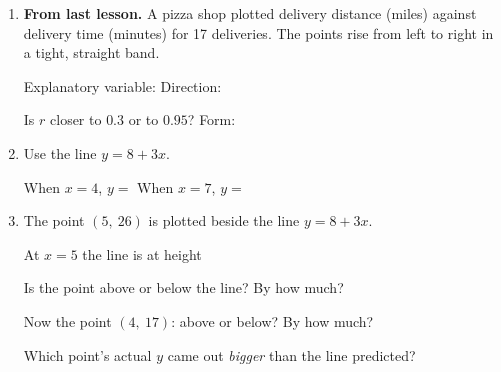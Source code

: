 \documentclass[12pt]{article}
\begin{document}

\vspace{0.28in}

\begin{enumerate}[leftmargin=1.9em, itemsep=1.0in]

  \item \textbf{From last lesson.} A pizza shop plotted delivery distance (miles) against
        delivery time (minutes) for 17 deliveries. The points rise from left to right in a
        tight, straight band.

        \vspace{12pt}
        Explanatory variable: \blank{3.4cm} \qquad Direction: \blank{2.4cm}

        \vspace{16pt}
        Is $r$ closer to $0.3$ or to $0.95$? \blank{1.6cm} \qquad Form: \blank{2.4cm}

  \item Use the line $y = 8 + 3x$.

        \vspace{12pt}
        When $x = 4$, \quad $y =$ \blank{3.6cm} \qquad When $x = 7$, \quad $y =$ \blank{3.6cm}

  \item The point $(5,\ 26)$ is plotted beside the line $y = 8 + 3x$.

        \vspace{12pt}
        At $x = 5$ the line is at height \blank{3.4cm}

        \vspace{16pt}
        Is the point above or below the line? \blank{2.0cm} \quad By how much? \blank{1.6cm}

        \vspace{16pt}
        Now the point $(4,\ 17)$: above or below? \blank{2.0cm} \quad By how much? \blank{1.6cm}

        \vspace{16pt}
        Which point's actual $y$ came out \emph{bigger} than the line predicted?\\[18pt]
        \writeline

\end{enumerate}
\end{document}
